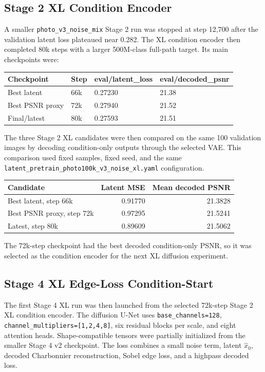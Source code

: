 \documentclass[10pt]{article}
\begin{document}
\subsection{Stage 2 XL Condition Encoder}

A smaller \texttt{photo\_v3\_noise\_mix} Stage 2 run was stopped at step 12,700
after the validation latent loss plateaued near 0.282. The XL condition encoder
then completed 80k steps with a larger 500M-class full-path target. Its main
checkpoints were:

\begin{table}[H]
\centering
\begin{tabular}{llll}
\toprule
Checkpoint & Step & eval/latent\_loss & eval/decoded\_psnr \\
\midrule
Best latent & 66k & 0.27230 & 21.38 \\
Best PSNR proxy & 72k & 0.27940 & 21.52 \\
Final/latest & 80k & 0.27593 & 21.51 \\
\bottomrule
\end{tabular}
\end{table}

The three Stage 2 XL candidates were then compared on the same 100 validation
images by decoding condition-only outputs through the selected VAE. This
comparison used fixed samples, fixed seed, and the same
\texttt{latent\_pretrain\_photo100k\_v3\_noise\_xl.yaml} configuration.

\begin{table}[H]
\centering
\begin{tabular}{lrr}
\toprule
Candidate & Latent MSE & Mean decoded PSNR \\
\midrule
Best latent, step 66k & 0.91770 & 21.3828 \\
Best PSNR proxy, step 72k & 0.97295 & 21.5241 \\
Latest, step 80k & 0.89609 & 21.5062 \\
\bottomrule
\end{tabular}
\end{table}

The 72k-step checkpoint had the best decoded condition-only PSNR, so it was
selected as the condition encoder for the next XL diffusion experiment.

\subsection{Stage 4 XL Edge-Loss Condition-Start}

The first Stage 4 XL run was then launched from the selected 72k-step Stage 2
XL condition encoder. The diffusion U-Net uses \texttt{base\_channels=128},
\texttt{channel\_multipliers=[1,2,4,8]}, six residual blocks per scale, and
eight attention heads. Shape-compatible tensors were partially initialized from
the smaller Stage 4 v2 checkpoint. The loss combines a small noise term,
latent \(\hat{x}_0\), decoded Charbonnier reconstruction, Sobel edge loss, and a
highpass decoded loss.
\end{document}
